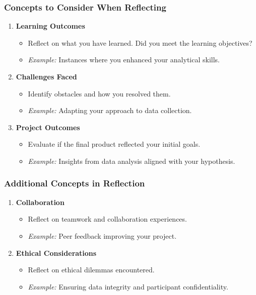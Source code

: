 \documentclass[aspectratio=169]{beamer}
\begin{document}
\begin{frame}[fragile]
    \frametitle{Concepts to Consider When Reflecting}
    \begin{enumerate}
        \item \textbf{Learning Outcomes}
        \begin{itemize}
            \item Reflect on what you have learned. Did you meet the learning objectives?
            \item \textit{Example:} Instances where you enhanced your analytical skills.
        \end{itemize}
        
        \item \textbf{Challenges Faced}
        \begin{itemize}
            \item Identify obstacles and how you resolved them.
            \item \textit{Example:} Adapting your approach to data collection.
        \end{itemize}
        
        \item \textbf{Project Outcomes}
        \begin{itemize}
            \item Evaluate if the final product reflected your initial goals.
            \item \textit{Example:} Insights from data analysis aligned with your hypothesis.
        \end{itemize}
    \end{enumerate}
\end{frame}

\begin{frame}[fragile]
    \frametitle{Additional Concepts in Reflection}
    \begin{enumerate}[resume]
        \item \textbf{Collaboration}
        \begin{itemize}
            \item Reflect on teamwork and collaboration experiences.
            \item \textit{Example:} Peer feedback improving your project.
        \end{itemize}
        
        \item \textbf{Ethical Considerations}
        \begin{itemize}
            \item Reflect on ethical dilemmas encountered.
            \item \textit{Example:} Ensuring data integrity and participant confidentiality.
        \end{itemize}
    \end{enumerate}
\end{frame}
\end{document}
